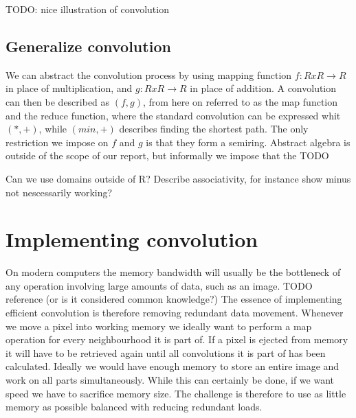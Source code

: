 TODO: nice illustration of convolution

\subsection{Generalize convolution}
We can abstract the convolution process by using mapping function $f: R x R \rightarrow R$ in place of multiplication, and $g: R x R \rightarrow R$ in place of addition.
A convolution can then be described as $(f, g)$, from here on referred to as the map function and the reduce function, where the standard convolution can be expressed whit $(*, +)$, while $(min, +)$ describes finding the shortest path.
The only restriction we impose on $f$ and $g$ is that they form a semiring.
Abstract algebra is outside of the scope of our report, but informally we impose that the TODO 

Can we use domains outside of R? 
Describe associativity, for instance show minus not nescessarily working?

\section{Implementing convolution}
On modern computers the memory bandwidth will usually be the bottleneck of any operation involving large amounts of data, such as an image. TODO reference (or is it considered common knowledge?)
The essence of implementing efficient convolution is therefore removing redundant data movement.
Whenever we move a pixel into working memory we ideally want to perform a map operation for every neighbourhood it is part of.
If a pixel is ejected from memory it will have to be retrieved again until all convolutions it is part of has been calculated.
Ideally we would have enough memory to store an entire image and work on all parts simultaneously. While this can certainly be done, if we want speed we have to sacrifice memory size.
The challenge is therefore to use as little memory as possible balanced with reducing redundant loads.\\

